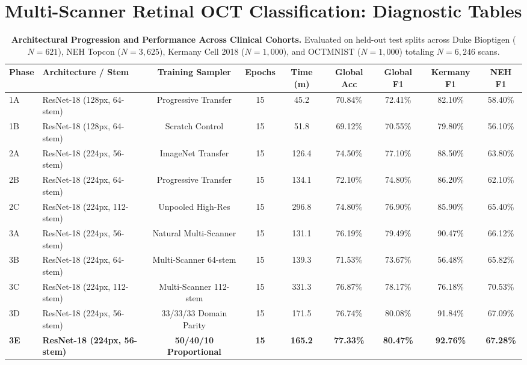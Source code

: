 \documentclass{article}
\begin{document}
\section*{Multi-Scanner Retinal OCT Classification: Diagnostic Tables}

\begin{table}[t]
\centering
\small
\caption{\textbf{Architectural Progression and Performance Across Clinical Cohorts.} Evaluated on held-out test splits across Duke Bioptigen ($N=621$), NEH Topcon ($N=3,625$), Kermany Cell 2018 ($N=1,000$), and OCTMNIST ($N=1,000$) totaling $N=6,246$ scans.}
\label{tab:model_progression}
\begin{tabular}{llccccccc}
\toprule
\textbf{Phase} & \textbf{Architecture / Stem} & \textbf{Training Sampler} & \textbf{Epochs} & \textbf{Time (m)} & \textbf{Global Acc} & \textbf{Global F1} & \textbf{Kermany F1} & \textbf{NEH F1} \\
\midrule
1A & ResNet-18 (128px, 64-stem) & Progressive Transfer & 15 & 45.2 & 70.84\% & 72.41\% & 82.10\% & 58.40\% \\
1B & ResNet-18 (128px, 64-stem) & Scratch Control & 15 & 51.8 & 69.12\% & 70.55\% & 79.80\% & 56.10\% \\
2A & ResNet-18 (224px, 56-stem) & ImageNet Transfer & 15 & 126.4 & 74.50\% & 77.10\% & 88.50\% & 63.80\% \\
2B & ResNet-18 (224px, 64-stem) & Progressive Transfer & 15 & 134.1 & 72.10\% & 74.80\% & 86.20\% & 62.10\% \\
2C & ResNet-18 (224px, 112-stem) & Unpooled High-Res & 15 & 296.8 & 74.80\% & 76.90\% & 85.90\% & 65.40\% \\
3A & ResNet-18 (224px, 56-stem) & Natural Multi-Scanner & 15 & 131.1 & 76.19\% & 79.49\% & 90.47\% & 66.12\% \\
3B & ResNet-18 (224px, 64-stem) & Multi-Scanner 64-stem & 15 & 139.3 & 71.53\% & 73.67\% & 56.48\% & 65.82\% \\
3C & ResNet-18 (224px, 112-stem) & Multi-Scanner 112-stem & 15 & 331.3 & 76.87\% & 78.17\% & 76.18\% & 70.53\% \\
3D & ResNet-18 (224px, 56-stem) & 33/33/33 Domain Parity & 15 & 171.5 & 76.74\% & 80.08\% & 91.84\% & 67.09\% \\
\textbf{3E} & \textbf{ResNet-18 (224px, 56-stem)} & \textbf{50/40/10 Proportional} & \textbf{15} & \textbf{165.2} & \textbf{77.33\%} & \textbf{80.47\%} & \textbf{92.76\%} & \textbf{67.28\%} \\
\bottomrule
\end{tabular}
\end{table}
\end{document}

